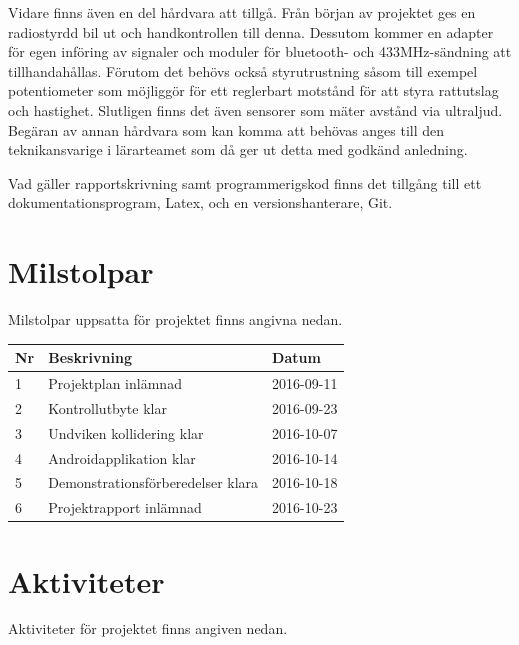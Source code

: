 \documentclass[a4paper]{article}
\begin{document}
Vidare finns även en del hårdvara att tillgå. Från början av projektet ges en radiostyrdd bil ut och handkontrollen till denna. Dessutom kommer en adapter för egen införing av signaler och moduler för bluetooth- och 433MHz-sändning att tillhandahållas. Förutom det behövs också styrutrustning såsom till exempel potentiometer som möjliggör för ett reglerbart motstånd för att styra rattutslag och hastighet. Slutligen finns det även sensorer som mäter avstånd via ultraljud. Begäran av annan hårdvara som kan komma att behövas anges till den teknikansvarige i lärarteamet som då ger ut detta med godkänd anledning.
 
Vad gäller rapportskrivning samt programmerigskod finns det tillgång till ett dokumentationsprogram, Latex, och en versionshanterare, Git. 

\section{Milstolpar}
Milstolpar uppsatta för projektet finns angivna nedan.
\vspace{5mm}

\begin{tabular}{|l|l|l|} \hline
\bf Nr & \bf Beskrivning & \bf Datum \\ \hline \hline
1 & Projektplan inlämnad & 2016-09-11 \\\hline
2 & Kontrollutbyte klar & 2016-09-23 \\ \hline
3 & Undviken kollidering klar & 2016-10-07 \\ \hline
4 & Androidapplikation klar & 2016-10-14 \\ \hline
5 & Demonstrationsförberedelser klara & 2016-10-18 \\ \hline
6 & Projektrapport inlämnad & 2016-10-23 \\ \hline

\end{tabular}

\section{Aktiviteter}
Aktiviteter för projektet finns angiven nedan.
\vspace{5mm}
\end{document}
